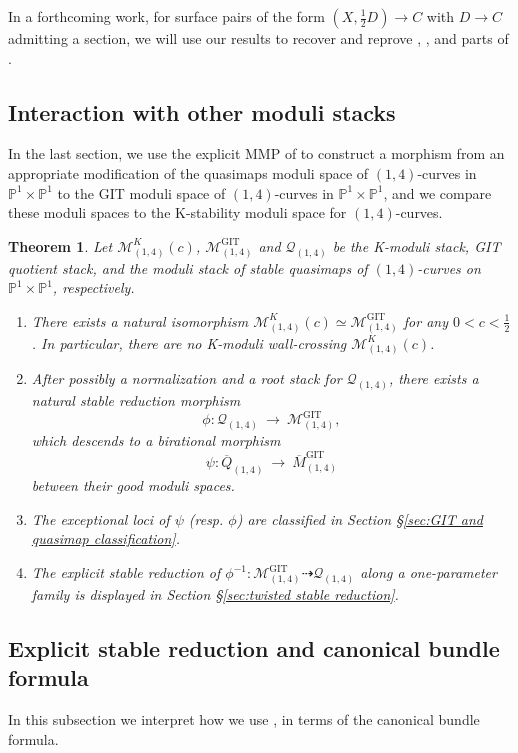 \documentclass[a4paper,12pt]{amsart}
\newcommand{\ove}[1]{\overline{#1}}
\newcommand{\cQ}{\mathcal{Q}}
\DeclareMathOperator{\GIT}{GIT}
\newcommand{\bP}{{\mathbb P}}
\newcommand\cM{{\mathcal{M}}}
\newtheorem{theorem}{Theorem}[section]
\theoremstyle{definition}
\theoremstyle{remark}
\begin{document}
In a forthcoming work, for surface pairs of the form $(X,\tfrac{1}{2}D)\to C$ with $D\to C$ admitting a section, we will use our results to recover and reprove \cite[Theorem~1.2]{inchiostro_elliptic}, \cite[Theorem~1.(a),(b)]{AB_del_pezzo}, and parts of \cite{AB_k3}.



\subsection*{Interaction with other moduli stacks}



In the last section, we use the explicit MMP of  to construct a morphism from an appropriate modification of the quasimaps moduli space of $(1,4)$-curves in $\bP^1\times \bP^1$ to the GIT moduli space of $(1,4)$-curves in $\bP^1\times \bP^1$, and we compare these moduli spaces to the K-stability moduli space for $(1,4)$-curves.

\begin{theorem}
 Let $\cM^K_{(1,4)}(c)$, $\cM^{\GIT}_{(1,4)}$ and ${\cQ}_{(1,4)}$ be the K-moduli stack, GIT quotient stack, and the moduli stack of stable quasimaps of $(1,4)$-curves on $\bP^1\times\bP^1$, respectively.
 \begin{enumerate}
     \item There exists a natural isomorphism $\cM^K_{(1,4)}(c)\simeq \cM^{\GIT}_{(1,4)}$ for any $0<c<\frac{1}{2}$. In particular, there are no K-moduli wall-crossing $\cM^K_{(1,4)}(c)$.
     \item After possibly a normalization and a root stack for ${\cQ}_{(1,4)}$, there exists a natural stable reduction morphism $$\phi:\cQ_{(1,4)}\ \longrightarrow \ \cM^{\GIT}_{(1,4)},$$ which descends to a birational morphism $$\psi\colon \ove{Q}_{(1,4)} \ \longrightarrow \ \ove{M}^{\GIT}_{(1,4)}$$ between their good moduli spaces.
     \item The exceptional loci of $\psi$ (resp. $\phi$) are classified in Section \S \ref{sec:GIT and quasimap classification}.
     \item The explicit stable reduction of $\phi^{-1}\colon \cM^{\GIT}_{(1,4)}\dashrightarrow {\cQ}_{(1,4)}$ along a one-parameter family is displayed in Section \S \ref{sec:twisted stable reduction}.
 \end{enumerate}
\end{theorem}

\subsection*{Explicit stable reduction and canonical bundle formula}
In this subsection we interpret how we use , in terms of the canonical bundle formula. 
\end{document}
